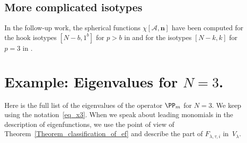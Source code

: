 \subsection{More complicated isotypes}
In the follow-up work, the spherical functions $\chi\left[  \mathcal{A},\mathbf{n}\right]  $ have
been computed for the hook isotypes $\left[  N-b,1^{b}\right]  $ for $p>b$ in
\cite{Dun25a} and for the isotypes $\left[  N-k,k\right]  $ for $p=3$ in
\cite{Dun25b}.

\section{Example: Eigenvalues for \texorpdfstring{$N=3$}{N=3}.}
\label{Section_N3}

Here is the full list of the eigenvalues of the operator $\PP_m$ for $N=3$. We keep using the notation~\eqref{eq_x3}. When we speak about leading monomials in the description of eigenfunctions, we use the point of view of Theorem~\ref{Theorem_classification_of_ef} and describe the part of $F_{\lambda,\tau,i}$ in~$V_\lambda$.

